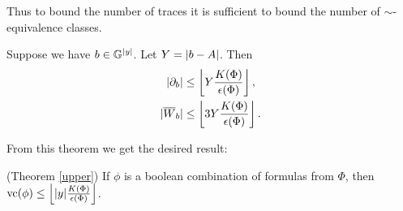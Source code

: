 Thus to bound the number of traces it is sufficient to bound the number of $\sim$-equivalence classes.

\begin{Theorem} \label{main_bound}
  Suppose we have $b \in \mathbb G^{|y|}$.
  Let $Y = \left|b - A\right|$.
  Then
  \begin{align*}
    |\partial_b| &\leq \left \lfloor Y \frac{K(\Phi)}{\epsilon(\Phi)}  \right \rfloor,\\ 
    |{\overline{W}}_b| &\leq \left \lfloor 3 Y \frac{K(\Phi)}{\epsilon(\Phi)} \right \rfloor.
  \end{align*}
\end{Theorem}

From this theorem we get the desired result:
\begin{Corollary} (Theorem \ref{upper})
  If $\phi$ is a boolean combination of formulas from $\Phi$, then $\operatorname{vc}(\phi) \leq \left \lfloor |y|\frac{K(\Phi)}{\epsilon(\Phi)} \right \rfloor$.
\end{Corollary}

